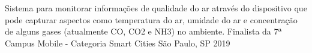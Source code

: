 
\begin{cventries}
  \cventry
    {Sistema para monitorar informações de qualidade do ar através do dispositivo que pode capturar aspectos como temperatura do ar, umidade do ar e concentração de alguns gases (atualmente CO, CO2 e NH3) no ambiente.}
    {Finalista da 7ª Campus Mobile - Categoria Smart Cities}
    {São Paulo, SP}
    {2019}
    {}
\end{cventries}
